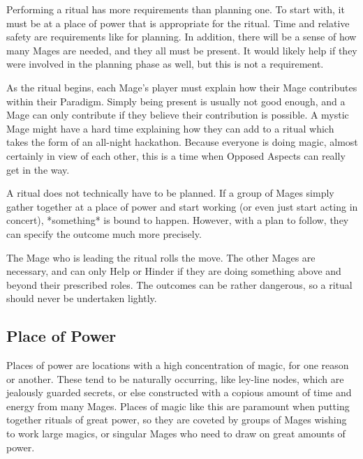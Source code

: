 \documentclass[
  oneside,
  statementpaper,
  9pt]{memoir}
\begin{document}
\begin{Player}

Performing a ritual has more requirements than planning one. To start with, it must be at a place of power that is appropriate for the ritual. Time and relative safety are requirements like for planning. In addition, there will be a sense of how many Mages are needed, and they all must be present. It would likely help if they were involved in the planning phase as well, but this is not a requirement.

As the ritual begins, each Mage’s player must explain how their Mage contributes within their Paradigm. Simply being present is usually not good enough, and a Mage can only contribute if they believe their contribution is possible. A mystic Mage might have a hard time explaining how they can add to a ritual which takes the form of an all-night hackathon. Because everyone is doing magic, almost certainly in view of each other, this is a time when Opposed Aspects can really get in the way.

A ritual does not technically have to be planned. If a group of Mages simply gather together at a place of power and start working (or even just start acting in concert), *something* is bound to happen. However, with a plan to follow, they can specify the outcome much more precisely.

The Mage who is leading the ritual rolls the move. The other Mages are necessary, and can only Help or Hinder if they are doing something above and beyond their prescribed roles. The outcomes can be rather dangerous, so a ritual should never be undertaken lightly. 

\end{Player}

\hypertarget{place-of-power}{%
\subsection{Place of Power}\label{place-of-power}}

\begin{Narrator}

Places of power are locations with a high concentration of magic, for one reason or another. These tend to be naturally occurring, like ley-line nodes, which are jealously guarded secrets, or else constructed with a copious amount of time and energy from many Mages. Places of magic like this are paramount when putting together rituals of great power, so they are coveted by groups of Mages wishing to work large magics, or singular Mages who need to draw on great amounts of power. 

\end{Narrator}
\end{document}
